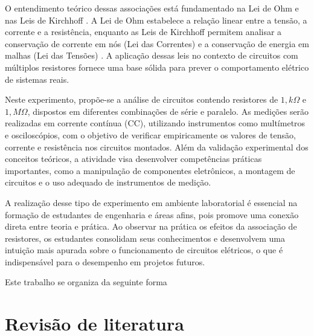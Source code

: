 \documentclass[conference]{IEEEtran}
\begin{document}
O entendimento teórico dessas associações está fundamentado na Lei de Ohm e nas Leis de Kirchhoff \cite{halliday}. A Lei de Ohm estabelece a relação linear entre a tensão, a corrente e a resistência, enquanto as Leis de Kirchhoff permitem analisar a conservação de corrente em nós (Lei das Correntes) e a conservação de energia em malhas (Lei das Tensões) \cite{halliday}. A aplicação dessas leis no contexto de circuitos com múltiplos resistores fornece uma base sólida para prever o comportamento elétrico de sistemas reais.

Neste experimento, propõe-se a análise de circuitos contendo resistores de $1,k\Omega$ e $1,M\Omega$, dispostos em diferentes combinações de série e paralelo. As medições serão realizadas em corrente contínua (CC), utilizando instrumentos como multímetros e osciloscópios, com o objetivo de verificar empiricamente os valores de tensão, corrente e resistência nos circuitos montados. Além da validação experimental dos conceitos teóricos, a atividade visa desenvolver competências práticas importantes, como a manipulação de componentes eletrônicos, a montagem de circuitos e o uso adequado de instrumentos de medição.

A realização desse tipo de experimento em ambiente laboratorial é essencial na formação de estudantes de engenharia e áreas afins, pois promove uma conexão direta entre teoria e prática. Ao observar na prática os efeitos da associação de resistores, os estudantes consolidam seus conhecimentos e desenvolvem uma intuição mais apurada sobre o funcionamento de circuitos elétricos, o que é indispensável para o desempenho em projetos futuros.

Este trabalho se organiza da seguinte forma %

\section{Revisão de literatura}


\end{document}
